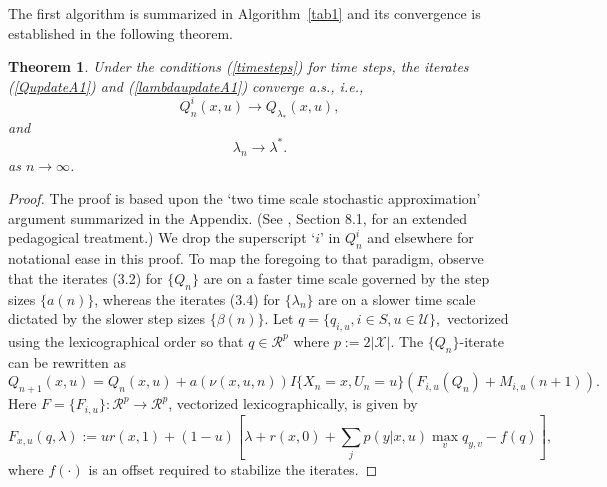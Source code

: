 \documentclass[12pt]{article}
\newtheorem{theorem}{Theorem}[section]
\newtheorem{remark}[theorem]{Remark}
\numberwithin{equation}{section}
\newcommand{\R}{\mathcal{R}}
\newcommand{\1}{\textbf{1}}
\newcommand{\U}{\mathcal{U}}
\newcommand{\X}{\mathcal{X}}
\begin{document}
The first algorithm is summarized in Algorithm~\ref{tab1} and its convergence is established in the following 
theorem.
\begin{theorem}\label{thm:A1}
Under the conditions (\ref{timesteps}) for time steps, 
the iterates (\ref{QupdateA1}) and (\ref{lambdaupdateA1})
converge a.s., i.e.,
$$
Q_n^i(x,u) \rightarrow Q_{\lambda_*}(x,u),
$$
and
$$
\lambda_n \rightarrow \lambda^*.
$$
as $n \rightarrow \infty$.
\end{theorem}
\begin{proof} 
The proof is based upon the `two time scale stochastic approximation' argument summarized in the Appendix. (See \cite{asyn}, Section 8.1, for an extended pedagogical treatment.) We drop the superscript `$i$' in $Q^i_n$ and elsewhere  for notational ease in this proof.  To map the foregoing to that paradigm, observe that the iterates (3.2) for $\{Q_n\}$ are on a faster time scale governed by the step sizes $\{a(n)\}$, whereas the iterates (3.4) for $\{\lambda_n\}$ are on a slower time scale dictated by the slower step sizes $\{\beta(n)\}$.  Let $q = \{q_{i,u}, i \in S, u \in  \U\},$ vectorized using the lexicographical order so that $q \in \R^p$ where $p := 2|\X|$.
The $\{Q_n\}$-iterate can be rewritten as
$$Q_{n+1}(x,u) = Q_n(x,u) + a(\nu(x,u,n))I\{X_n=x,U_n=u\}\left(F_{i,u}(Q_n) + M_{i,u}(n+1)\right).$$
Here $F = \{F_{i,u}\}: \R^p \to \R^p$, vectorized lexicographically,  is given by
$$F_{x,u}(q, \lambda) := ur(x,1) + (1-u)\left[\lambda + r(x,0) + \sum_jp(y|x,u)\max_vq_{y,v} - f(q)\right],$$
where $f(\cdot)$ is an offset required to stabilize the iterates.
%

\end{proof}
\end{document}

